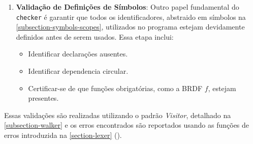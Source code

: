 \begin{enumerate}
    \item \textbf{Validação de Definições de Símbolos}:
        Outro papel fundamental do \texttt{checker} é garantir que todos os identificadores, abstraido em símbolos na \autoref{subsection-symbols-scopes}, utilizados no programa estejam devidamente definidos antes de serem usados. Essa etapa inclui:
    \begin{itemize}
        \item Identificar declarações ausentes.
        \item Identificar dependencia circular.
        \item Certificar-se de que funções obrigatórias, como a BRDF $f$, estejam presentes.
    \end{itemize}
\end{enumerate}

Essas validações são realizadas utilizando o padrão \textit{Visitor}, detalhado na \autoref{subsection-walker} e os erros encontrados são reportados usando as funções de erros introduzida na \autoref{section-lexer} (\label{function-errors}).

%
%
%
%

